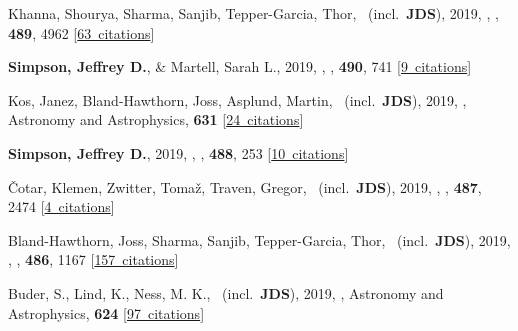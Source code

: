 \item[{\color{numcolor}\scriptsize32}] Khanna, Shourya, Sharma, Sanjib, Tepper-Garcia, Thor, \etal\ (incl.\ \textbf{JDS}), 2019, , \mnras, \textbf{489}, 4962 [\href{https://ui.adsabs.harvard.edu/#abs/2019MNRAS.489.4962K}{63~citations}]

\item[{\color{numcolor}\scriptsize31}] \textbf{Simpson, Jeffrey D.}, \& Martell, Sarah L., 2019, , \mnras, \textbf{490}, 741 [\href{https://ui.adsabs.harvard.edu/#abs/2019MNRAS.490..741S}{9~citations}]

\item[{\color{numcolor}\scriptsize30}] Kos, Janez, Bland-Hawthorn, Joss, Asplund, Martin, \etal\ (incl.\ \textbf{JDS}), 2019, , Astronomy and Astrophysics, \textbf{631} [\href{https://ui.adsabs.harvard.edu/#abs/2019A&A...631A.166K}{24~citations}]

\item[{\color{numcolor}\scriptsize29}] \textbf{Simpson, Jeffrey D.}, 2019, , \mnras, \textbf{488}, 253 [\href{https://ui.adsabs.harvard.edu/#abs/2019MNRAS.488..253S}{10~citations}]

\item[{\color{numcolor}\scriptsize28}] {\v{C}}otar, Klemen, Zwitter, Toma{\v{z}}, Traven, Gregor, \etal\ (incl.\ \textbf{JDS}), 2019, , \mnras, \textbf{487}, 2474 [\href{https://ui.adsabs.harvard.edu/#abs/2019MNRAS.487.2474C}{4~citations}]

\item[{\color{numcolor}\scriptsize27}] Bland-Hawthorn, Joss, Sharma, Sanjib, Tepper-Garcia, Thor, \etal\ (incl.\ \textbf{JDS}), 2019, , \mnras, \textbf{486}, 1167 [\href{https://ui.adsabs.harvard.edu/#abs/2019MNRAS.486.1167B}{157~citations}]

\item[{\color{numcolor}\scriptsize26}] Buder, S., Lind, K., Ness, M. K., \etal\ (incl.\ \textbf{JDS}), 2019, , Astronomy and Astrophysics, \textbf{624} [\href{https://ui.adsabs.harvard.edu/#abs/2019A&A...624A..19B}{97~citations}]

